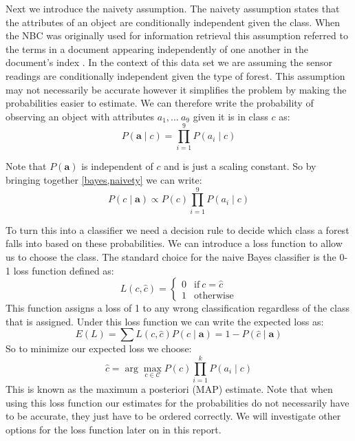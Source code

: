 Next we introduce the naivety assumption.
The naivety assumption states that the attributes of an object are conditionally independent given the class.
When the NBC was originally used for information retrieval this assumption referred to the terms in a document appearing independently of one another in the document's index \cite{Maron60}.
In the context of this data set we are assuming the sensor readings are conditionally independent given the type of forest.
This assumption may not necessarily be accurate however it simplifies the problem by making the probabilities easier to estimate.
We can therefore write the probability of observing an object with attributes $a_1, \dots\ a_9$ given it is in class $c$ as:
\begin{equation} \label{naivety}
	P(\mathbf{a} \mid c) = \prod_{i=1}^9 P(a_i \mid c)
\end{equation}

Note that $P(\mathbf{a})$ is independent of $c$ and is just a scaling constant.
So by bringing together \cref{bayes,naivety} we can write:
\begin{equation}
	P(c \mid \mathbf{a}) \propto P(c)\prod_{i=1}^{9}P(a_i \mid c)
\end{equation}

To turn this into a classifier we need a decision rule to decide which class a forest falls into based on these probabilities.
We can introduce a loss function to allow us to choose the class.
The standard choice for the naive Bayes classifier is the 0-1 loss function \cite{Rish01} defined as:
\begin{equation}\label{0-1_loss_function}
	L(c, \hat{c}) = 
	\begin{cases}
		0 & \text{if}\ c = \hat{c} \\
		1 & \text{otherwise}
	\end{cases}
\end{equation}
This function assigns a loss of 1 to any wrong classification regardless of the class that is assigned. 
Under this loss function we can write the expected loss as:
\begin{equation}
	E(L) = \sum L(c, \hat{c})P(c \mid \mathbf{a}) = 1 - P(\hat{c} \mid \mathbf{a})
\end{equation}
So to minimize our expected loss we choose:
\begin{equation} \label{map_estimate}
	\hat c = \arg\max_{c \in \mathcal{C}} P(c)\prod_{i=1}^{k}P(a_i \mid c)
\end{equation}
This is known as the maximum a posteriori (MAP) estimate.
Note that when using this loss function our estimates for the probabilities do not necessarily have to be accurate, they just have to be ordered correctly.
We will investigate other options for the loss function later on in this report.

